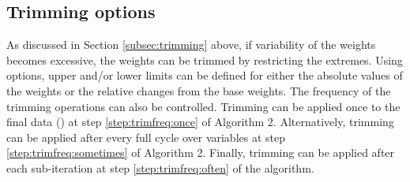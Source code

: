\subsection{Trimming options}
\label{subsec:example:trimming}


As discussed in Section \ref{subsec:trimming} above, if variability of the weights
becomes excessive, the weights can be trimmed by restricting the extremes.
Using  options, upper and/or lower limits can be defined
for either the absolute values of the weights or the relative changes from
the base weights. The frequency of the trimming operations can also be controlled.
Trimming can be applied once to the final data ()
at step \ref{step:trimfreq:once} of Algorithm 2.
Alternatively, trimming can be applied after every full cycle over variables
at step \ref{step:trimfreq:sometimes} of Algorithm 2.
Finally, trimming can be applied after each sub-iteration
at step \ref{step:trimfreq:often} of the algorithm.

